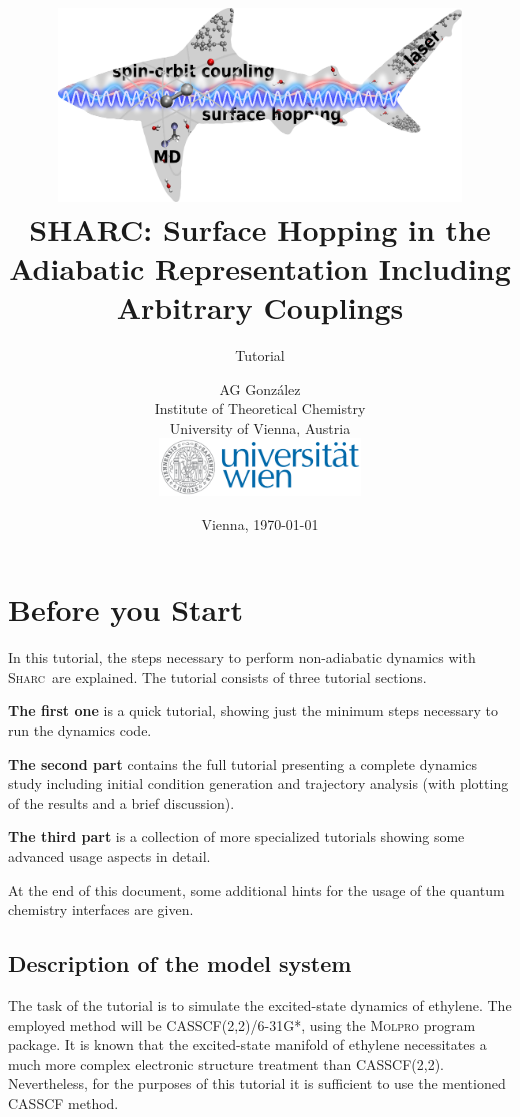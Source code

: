 \documentclass[a4paper,11pt,DIV=15,openany]{scrbook}
\title{\hspace{1cm}\includegraphics[width=0.8\textwidth,keepaspectratio=true]{img/sharc.png}\vspace{1.5cm}\\
    SHARC: Surface Hopping in the Adiabatic Representation Including Arbitrary Couplings}
\subtitle{Tutorial}
\date{Vienna, \today}
\author{AG Gonz\'alez\\
Institute of Theoretical Chemistry\\
University of Vienna, Austria
\vspace{1cm}
\\
\includegraphics[width=0.4\textwidth,keepaspectratio=true]{img/univie.pdf}}
\newcommand{\sharc}{\textsc{Sharc}}
\begin{document}


\tableofcontents


\chapter{Before you Start}

In this tutorial, the steps necessary to perform non-adiabatic dynamics with \sharc\ are explained. 
The tutorial consists of three tutorial sections. 

\textbf{The first one} is a quick tutorial, showing just the minimum steps necessary to run the dynamics code. 

\textbf{The second part} contains the full tutorial presenting a complete dynamics study including initial condition generation and trajectory analysis (with plotting of the results and a brief discussion). 

\textbf{The third part} is a collection of more specialized tutorials showing some advanced usage aspects in detail.

At the end of this document, some additional hints for the usage of the quantum chemistry interfaces are given.




\section{Description of the model system}

The task of the tutorial is to simulate the excited-state dynamics of ethylene. The employed method will be CASSCF(2,2)/6-31G*, using the \textsc{Molpro} program package. It is known that the excited-state manifold of ethylene necessitates a much more complex electronic structure treatment than CASSCF(2,2). Nevertheless, for the purposes of this tutorial it is sufficient to use the mentioned CASSCF method.
\end{document}
